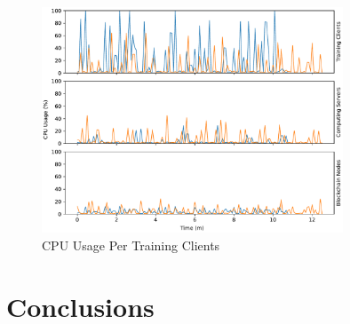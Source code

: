 \begin{figure}[!hpb]
    \centering
    \centering
    \includegraphics[width=0.8\textwidth]{graphics/vertical/cpu.pdf}
    \caption{CPU Usage Per Training Clients}
    \label{fig:cpu_vertical}
\end{figure}

\section{Conclusions} %
